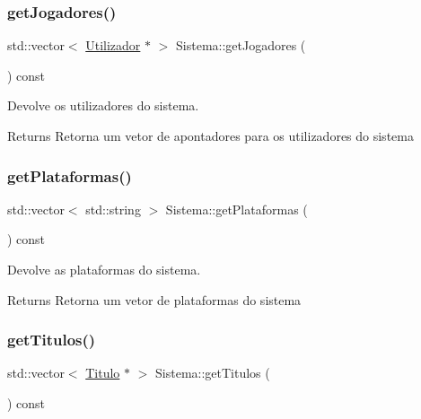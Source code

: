 \subsubsection{\texorpdfstring{get\+Jogadores()}{getJogadores()}}
{\footnotesize\ttfamily std\+::vector$<$ \mbox{\hyperlink{class_utilizador}{Utilizador}} $\ast$ $>$ Sistema\+::get\+Jogadores (\begin{DoxyParamCaption}{ }\end{DoxyParamCaption}) const}



Devolve os utilizadores do sistema. 

\begin{DoxyReturn}{Returns}
Retorna um vetor de apontadores para os utilizadores do sistema 
\end{DoxyReturn}
\mbox{\label{class_sistema_ac7b28e4e7856327b1553133c39a843d6}} 
\subsubsection{\texorpdfstring{get\+Plataformas()}{getPlataformas()}}
{\footnotesize\ttfamily std\+::vector$<$ std\+::string $>$ Sistema\+::get\+Plataformas (\begin{DoxyParamCaption}{ }\end{DoxyParamCaption}) const}



Devolve as plataformas do sistema. 

\begin{DoxyReturn}{Returns}
Retorna um vetor de plataformas do sistema 
\end{DoxyReturn}
\mbox{\label{class_sistema_af870153af417f47e9ef1d53fdadffa3a}} 
\subsubsection{\texorpdfstring{get\+Titulos()}{getTitulos()}}
{\footnotesize\ttfamily std\+::vector$<$ \mbox{\hyperlink{class_titulo}{Titulo}} $\ast$ $>$ Sistema\+::get\+Titulos (\begin{DoxyParamCaption}{ }\end{DoxyParamCaption}) const}



